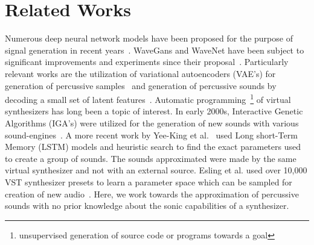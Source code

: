 \documentclass[runningheads,a4paper]{llncs}
\begin{document}
\section{Related Works}
Numerous deep neural network models have been proposed for the purpose of signal generation in recent years~\cite{nsynth2017,yamamoto2020parallel,oord2017parallel,yee2018automatic,ramires2020neural}. WaveGans and WaveNet have been subject to significant improvements and experiments since their proposal~\cite{nsynth2017,yamamoto2020parallel,oord2017parallel}. Particularly relevant works are the utilization of variational autoencoders (VAE's) for generation of percussive samples~\cite{aouameur2019neural} and generation of percussive sounds by decoding a small set of latent features~\cite{ramires2020neural}. Automatic programming~\footnote{unsupervised generation of source code or programs towards a goal} of virtual synthesizers has long been a topic of interest. In early 2000s, Interactive Genetic Algorithms (IGA's) were utilized for the generation of new sounds with various sound-engines~\cite{johnson1999exploring,dahlstedt2001creating}. A more recent work by Yee-King et al.~\cite{yee2018automatic} used Long short-Term Memory (LSTM) models and heuristic search to find the exact parameters used to create a group of sounds. The sounds approximated were made by the same virtual synthesizer and not with an external source. Esling et al. used  over 10,000 VST synthesizer presets to learn a parameter space which can be sampled for creation of new audio~\cite{esling2019universal}. Here, we work towards the approximation of percussive sounds with no prior knowledge about the sonic capabilities of a synthesizer.
\end{document}
